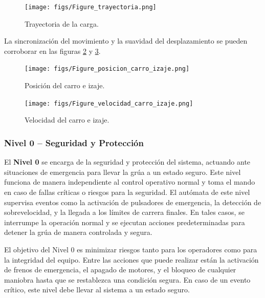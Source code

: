 \documentclass{article}
\begin{document}
            \begin{figure}[H]
                \centering
                \texttt{[image: figs/Figure\_trayectoria.png]}
                \caption{Trayectoria de la carga.}
                \label{fig:trayectoria}
            \end{figure}

            La sincronización del movimiento y la suavidad del desplazamiento se pueden corroborar en las figuras \ref{fig:posicion_carro_izaje} y \ref{fig:velocidad_carro_izaje}.

            \begin{figure}[H]
                \centering
                \texttt{[image: figs/Figure\_posicion\_carro\_izaje.png]}
                \caption{Posición del carro e izaje.}
                \label{fig:posicion_carro_izaje}
            \end{figure}

            \begin{figure}[H]
                \centering
                \texttt{[image: figs/Figure\_velocidad\_carro\_izaje.png]}
                \caption{Velocidad del carro e izaje.}
                \label{fig:velocidad_carro_izaje}
            \end{figure}


            \subsubsection{Nivel 0 – Seguridad y Protección}

            El \textbf{Nivel 0} se encarga de la seguridad y protección del sistema, actuando ante situaciones de emergencia para llevar la grúa a un estado seguro. Este nivel funciona de manera independiente al control operativo normal y toma el mando en caso de fallas críticas o riesgos para la seguridad. El autómata de este nivel supervisa eventos como la activación de pulsadores de emergencia, la detección de sobrevelocidad, y la llegada a los límites de carrera finales. En tales casos, se interrumpe la operación normal y se ejecutan acciones predeterminadas para detener la grúa de manera controlada y segura.
            
            El objetivo del Nivel 0 es minimizar riesgos tanto para los operadores como para la integridad del equipo. Entre las acciones que puede realizar están la activación de frenos de emergencia, el apagado de motores, y el bloqueo de cualquier maniobra hasta que se restablezca una condición segura. En caso de un evento crítico, este nivel debe llevar al sistema a un estado seguro.
\end{document}
